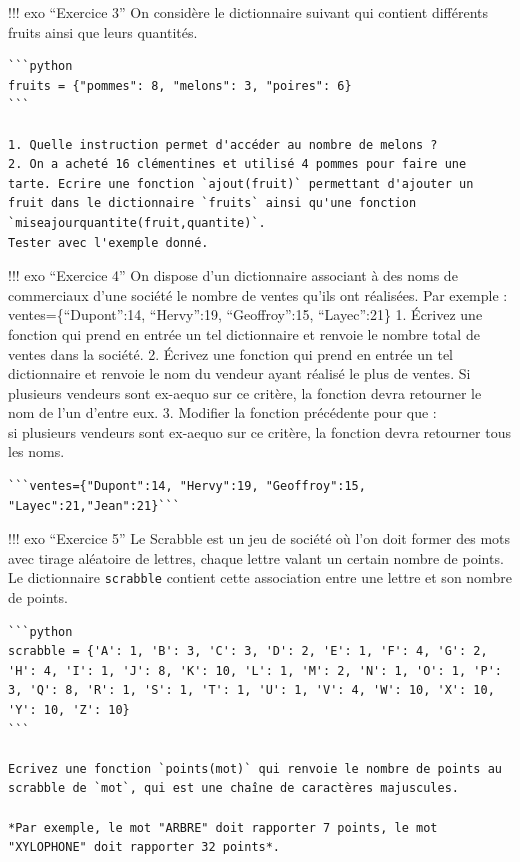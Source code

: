 \documentclass[
]{article}
\begin{document}
!!! exo ``Exercice 3'' On considère le dictionnaire suivant qui contient
différents fruits ainsi que leurs quantités.

\begin{verbatim}
```python
fruits = {"pommes": 8, "melons": 3, "poires": 6}
```

1. Quelle instruction permet d'accéder au nombre de melons ?
2. On a acheté 16 clémentines et utilisé 4 pommes pour faire une tarte. Ecrire une fonction `ajout(fruit)` permettant d'ajouter un fruit dans le dictionnaire `fruits` ainsi qu'une fonction `miseajourquantite(fruit,quantite)`.  
Tester avec l'exemple donné.
\end{verbatim}

!!! exo ``Exercice 4'' On dispose d'un dictionnaire associant à des noms
de commerciaux d'une société le nombre de ventes qu'ils ont réalisées.
Par exemple : ventes=\{``Dupont'':14, ``Hervy'':19, ``Geoffroy'':15,
``Layec'':21\} 1. Écrivez une fonction qui prend en entrée un tel
dictionnaire et renvoie le nombre total de ventes dans la société. 2.
Écrivez une fonction qui prend en entrée un tel dictionnaire et renvoie
le nom du vendeur ayant réalisé le plus de ventes. Si plusieurs vendeurs
sont ex-aequo sur ce critère, la fonction devra retourner le nom de l'un
d'entre eux. 3. Modifier la fonction précédente pour que :\\
si plusieurs vendeurs sont ex-aequo sur ce critère, la fonction devra
retourner tous les noms.

\begin{verbatim}
```ventes={"Dupont":14, "Hervy":19, "Geoffroy":15, "Layec":21,"Jean":21}```
\end{verbatim}

!!! exo ``Exercice 5'' Le Scrabble est un jeu de société où l'on doit
former des mots avec tirage aléatoire de lettres, chaque lettre valant
un certain nombre de points. Le dictionnaire \texttt{scrabble} contient
cette association entre une lettre et son nombre de points.

\begin{verbatim}
```python
scrabble = {'A': 1, 'B': 3, 'C': 3, 'D': 2, 'E': 1, 'F': 4, 'G': 2, 'H': 4, 'I': 1, 'J': 8, 'K': 10, 'L': 1, 'M': 2, 'N': 1, 'O': 1, 'P': 3, 'Q': 8, 'R': 1, 'S': 1, 'T': 1, 'U': 1, 'V': 4, 'W': 10, 'X': 10, 'Y': 10, 'Z': 10}
```

Ecrivez une fonction `points(mot)` qui renvoie le nombre de points au scrabble de `mot`, qui est une chaîne de caractères majuscules.

*Par exemple, le mot "ARBRE" doit rapporter 7 points, le mot "XYLOPHONE" doit rapporter 32 points*.
\end{verbatim}
\end{document}
